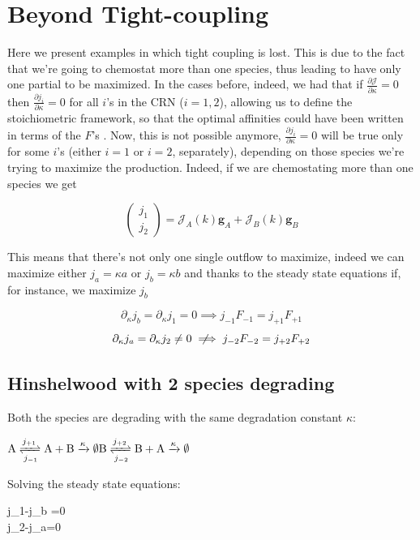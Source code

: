 \documentclass{article}
\newcommand{\notimplies}{%
	\mathrel{{\ooalign{\hidewidth$\not\phantom{=}$\hidewidth\cr$\implies$}}}}
\begin{document}
	
	\section{Beyond Tight-coupling}
	Here we present examples in which tight coupling is lost. This is due to the fact that we're going to chemostat more than one species, thus leading to have only one partial to be maximized. In the cases before, indeed, we had that if $\frac{\partial \mathcal{J}}{\partial \kappa}=0$ then $\frac{\partial j_i}{\partial \kappa}=0$ for all $i$'s in the CRN ($i=1,2$), allowing us to define the stoichiometric framework, so that the optimal affinities could have been written in terms of the $F$'s . Now, this is not possible anymore, $\frac{\partial j_i}{\partial \kappa}=0$ will be true only for some $i$'s (either $i=1$ or $i=2$, separately), depending on those species we're trying to maximize the production. Indeed, if we are chemostating more than one species we get
	
	$$\begin{pmatrix}
		j_1 \\ j_2 
	\end{pmatrix}=\mathcal{J}_A(k) \mathbf{g}_A+\mathcal{J}_B(k) \mathbf{g}_B$$
	
	This means that there's not only one single outflow to maximize, indeed we can maximize either $j_a=\kappa a$ or $j_b=\kappa b$ and thanks to the steady state equations if, for instance, we maximize $j_b$
	
	$$\partial_{\kappa} j_b = \partial_{\kappa} j_1=0 \implies j_{-1}F_{-1}=j_{+1}F_{+1}$$
	$$\partial_{\kappa} j_a = \partial_{\kappa} j_2 \neq 0 \notimplies j_{-2}F_{-2}=j_{+2}F_{+2}$$
	
	\subsection{Hinshelwood with 2 species degrading}
	Both the species are degrading with the same degradation constant $\kappa$:
	\begin{center}
		
		\hfill \break
		
		$\mathrm{A} \xrightleftharpoons[j_{-1}]{j_{+1}}\mathrm{A+B}\xrightarrow{\kappa}\emptyset\\
		\mathrm{B} \xrightleftharpoons[j_{-2}]{j_{+2}}\mathrm{B+A}\xrightarrow{\kappa}\emptyset\\
		$
		
		
	\end{center}
	Solving the steady state equations: 
	\hfill \break
	\hfill \break
	\begin{center}
		
		\begin{cases}
			j_1-j_b =0 \\ j_2-j_a=0
		\end{cases}
	\end{center}
	
\end{document}
